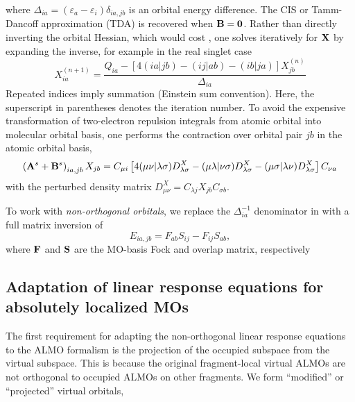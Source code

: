 \documentclass[%
  class = book,%
  crop = false,%
  float = true,%
  multi = true,%
  preview = false,%
]{standalone}
\begin{document}
where \(\Delta_{ia} = (\varepsilon_{a} - \varepsilon_{i}) \delta_{ia,jb}\) is an orbital energy difference. The CIS or Tamm-Dancoff approximation (TDA) is recovered when \(\mathbf{B} = \mathbf{0}\). Rather than directly inverting the orbital Hessian, which would cost , one solves iteratively for \(\mathbf{X}\) by expanding the inverse, for example in the real singlet case
\begin{equation}
  \label{eq:update}
  X_{ia}^{(n+1)}
  =
  \frac{Q_{ia} - \left[4(ia|jb) - (ij|ab) - (ib|ja)\right] X_{jb}^{(n)}}
       {\Delta_{ia}}
\end{equation}
Repeated indices imply summation (Einstein sum convention). Here, the superscript in parentheses denotes the iteration number. To avoid the expensive transformation of two-electron repulsion integrals from atomic orbital into molecular orbital basis, one performs the contraction over orbital pair \(jb\) in the atomic orbital basis,
\begin{equation}
  \left(\mathbf{A}^{s} + \mathbf{B}^{s}\right)_{ia,jb} X_{jb}
  =
  C_{\mu i}
  \left[
    4 (\mu\nu|\lambda\sigma) D_{\lambda\sigma}^{X}
    - (\mu\lambda|\nu\sigma) D_{\lambda\sigma}^{X}
    - (\mu\sigma|\lambda\nu) D_{\lambda\sigma}^{X}
  \right]
  C_{\nu a}
\end{equation}
with the perturbed density matrix \(D_{\mu\nu}^{X} = C_{\lambda j} X_{jb} C_{\sigma b}\).

To work with \emph{non-orthogonal orbitals}, we replace the \(\Delta_{ia}^{-1}\) denominator in  with a full matrix inversion of
\begin{equation}
  \label{eq:energy-denominator}
  E_{ia,jb} = F_{ab}S_{ij} - F_{ij}S_{ab},
\end{equation}
where \(\mathbf{F}\) and \(\mathbf{S}\) are the MO-basis Fock and overlap matrix, respectively

\subsection{Adaptation of linear response equations for absolutely localized MOs}
\label{ssec:almo-adaptation}

The first requirement for adapting the non-orthogonal linear response equations to the ALMO formalism is the projection of the occupied subspace from the virtual subspace. This is because the original fragment-local virtual ALMOs are not orthogonal to occupied ALMOs on other fragments. We form ``modified'' or ``projected'' virtual orbitals,
\end{document}
